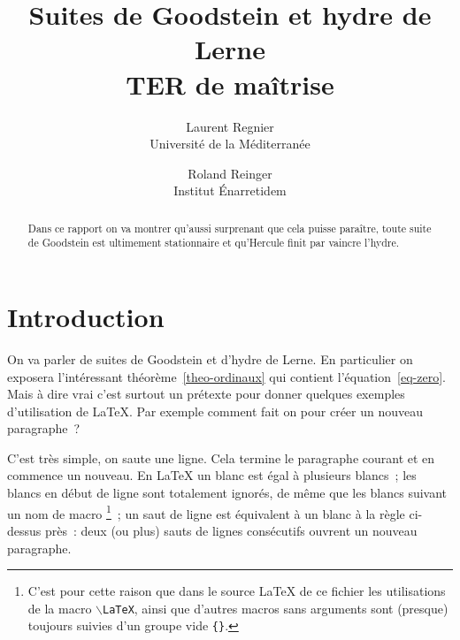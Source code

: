 \documentclass{article}
\author{Laurent Regnier\\
        Université de la Méditerranée
        \and 
        Roland Reinger\\
        Institut Énarretidem
}
\title{Suites de Goodstein et hydre de Lerne\\
       \small TER de maîtrise}
\begin{document}
\maketitle

\begin{abstract}
  Dans ce rapport on va montrer qu'aussi surprenant que cela puisse paraître,
  toute suite de Goodstein est ultimement stationnaire et qu'Hercule finit par
  vaincre l'hydre.
\end{abstract}

\tableofcontents

\newpage
\section{Introduction}
On va parler de suites de Goodstein et d'hydre de Lerne. En particulier on
exposera l'intéressant théorème~\ref{theo-ordinaux} %
qui contient l'équation~\ref{eq-zero}.  Mais à dire vrai c'est surtout un
prétexte pour donner quelques exemples d'utilisation de \LaTeX. Par exemple
comment fait on pour créer un nouveau paragraphe~?

C'est très simple, on saute une ligne. Cela termine le paragraphe courant et
en commence un nouveau. En \LaTeX{} un blanc est égal à    plusieurs   blancs~;
les blancs en début de ligne sont totalement ignorés, de même que les blancs
suivant un nom de macro%
\footnote{C'est pour cette raison que dans le source \LaTeX{} de ce
  fichier les utilisations de la macro \texttt{$\backslash$LaTeX},
  ainsi que d'autres macros sans arguments sont (presque) toujours
  suivies d'un groupe vide \texttt{\{\}}.%
}~;
un saut de ligne est équivalent à un blanc à la règle ci-dessus près~: deux (ou
plus) sauts de lignes consécutifs ouvrent un nouveau paragraphe.
\end{document}
